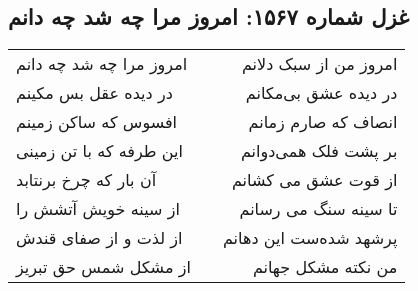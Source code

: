 \begin{center}
\section*{غزل شماره ۱۵۶۷: امروز مرا چه شد چه دانم}
\label{sec:1567}
\begin{longtable}{l p{0.5cm} r}
امروز مرا چه شد چه دانم
&&
امروز من از سبک دلانم
\\
در دیده عقل بس مکینم
&&
در دیده عشق بی‌مکانم
\\
افسوس که ساکن زمینم
&&
انصاف که صارم زمانم
\\
این طرفه که با تن زمینی
&&
بر پشت فلک همی‌دوانم
\\
آن بار که چرخ برنتابد
&&
از قوت عشق می کشانم
\\
از سینه خویش آتشش را
&&
تا سینه سنگ می رسانم
\\
از لذت و از صفای قندش
&&
پرشهد شده‌ست این دهانم
\\
از مشکل شمس حق تبریز
&&
من نکته مشکل جهانم
\\
\end{longtable}
\end{center}
